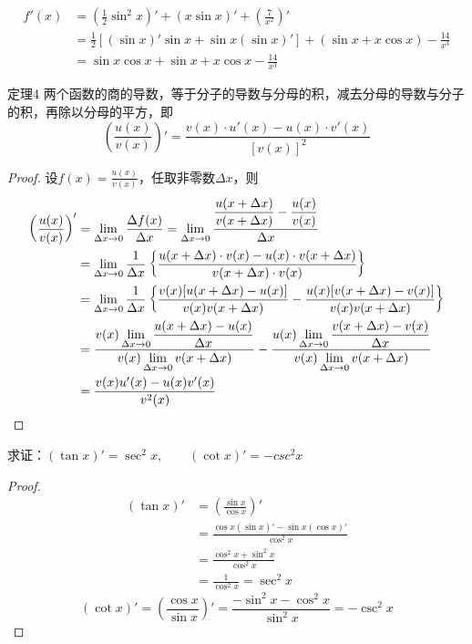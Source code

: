 \begin{solution}
\[\begin{split}
    f'(x)&=\left(\frac{1}{2}\sin^2 x\right)'+(x\sin x)'+\left(\frac{7}{x^2}\right)'\\
    &=\frac{1}{2}\left[(\sin x)'\sin x+\sin x(\sin x)'\right]+(\sin x+x\cos x)-\frac{14}{x^3}\\
    &=\sin x\cos x+\sin x+x\cos x-\frac{14}{x^3}
\end{split}\]
\end{solution}

\begin{blk}
    {定理4} 两个函数的商的导数，等于分子的导数与分母的积，减去分母的导数与分子的积，再除以分母的平方，即
\[\left(\frac{u(x)}{v(x)}\right)'=\frac{v(x)\cdot u'(x)-u(x)\cdot v'(x)}{[v(x)]^2}\]
\end{blk}

\begin{proof}
    设$f(x)=\frac{u(x)}{v(x)}$，任取非零数$\Delta x$，则
\[\begin{split}
    \left(\dfrac{u(x)}{v(x)}\right)'&=\lim_{\Delta x\to 0}\dfrac{\Delta f(x)}{\Delta x}=\lim_{\Delta x\to 0}\dfrac{\dfrac{u(x+\Delta x)}{v(x+\Delta x)}-\dfrac{u(x)}{v(x)}}{\Delta x}\\
    &=\lim_{\Delta x\to 0}\dfrac{1}{\Delta x}\left\{\dfrac{u(x+\Delta x)\cdot v(x)-u(x)\cdot v(x+\Delta x)}{v(x+\Delta x)\cdot v(x)}\right\}\\
    &=\lim_{\Delta x\to 0}\dfrac{1}{\Delta x}\left\{\dfrac{v(x)[u(x+\Delta x)-u(x)]}{v(x)v(x+\Delta x)}-\dfrac{u(x)[v(x+\Delta x)-v(x)]}{v(x)v(x+\Delta x)}\right\}\\
    &=\dfrac{v(x)\displaystyle\lim_{\Delta x\to 0}\dfrac{u(x+\Delta x)-u(x)}{\Delta x}}{v(x)\displaystyle\lim_{\Delta x\to 0}v(x+\Delta x)}-\dfrac{u(x)\displaystyle\lim_{\Delta x\to 0}\dfrac{v(x+\Delta x)-v(x)}{\Delta x}}{v(x)\displaystyle\lim_{\Delta x\to 0}v(x+\Delta x)}\\
    &=\dfrac{v(x) u'(x)-u(x) v'(x)}{v^2(x)}
\end{split}\]
\end{proof}


\begin{example}
求证：$(\tan x)'=\sec^2 x,\qquad (\cot x)'=-csc^2 x$
\end{example}

\begin{proof}    
\[\begin{split}
    (\tan x)'&=\left(\frac{\sin x}{\cos x}\right)'\\
    &=\frac{\cos x(\sin x)'-\sin x(\cos x)'}{\cos^2 x}\\
    &=\frac{\cos^2 x+\sin^2 x}{\cos^2x}\\
    &=\frac{1}{\cos^2 x}=\sec^2 x
\end{split}\]
\[(\cot x)'=\left(\frac{\cos x}{\sin x}\right)'=\frac{-\sin^2 x-\cos^2 x}{\sin^2 x}=-\csc^2 x\]    
\end{proof}

